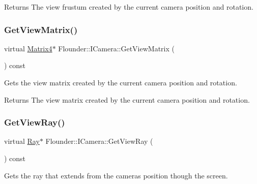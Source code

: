 \begin{DoxyReturn}{Returns}
The view frustum created by the current camera position and rotation. 
\end{DoxyReturn}
\mbox{\label{class_flounder_1_1_i_camera_a959df8b3c98c82dc428dcf26b4650913}} 
\subsubsection{\texorpdfstring{Get\+View\+Matrix()}{GetViewMatrix()}}
{\footnotesize\ttfamily virtual \hyperlink{class_flounder_1_1_matrix4}{Matrix4}$\ast$ Flounder\+::\+I\+Camera\+::\+Get\+View\+Matrix (\begin{DoxyParamCaption}{ }\end{DoxyParamCaption}) const\hspace{0.3cm}{\ttfamily [pure virtual]}}



Gets the view matrix created by the current camera position and rotation. 

\begin{DoxyReturn}{Returns}
The view matrix created by the current camera position and rotation. 
\end{DoxyReturn}
\mbox{\label{class_flounder_1_1_i_camera_a28bd4870a68a234e8f188229387625c7}} 
\subsubsection{\texorpdfstring{Get\+View\+Ray()}{GetViewRay()}}
{\footnotesize\ttfamily virtual \hyperlink{class_flounder_1_1_ray}{Ray}$\ast$ Flounder\+::\+I\+Camera\+::\+Get\+View\+Ray (\begin{DoxyParamCaption}{ }\end{DoxyParamCaption}) const\hspace{0.3cm}{\ttfamily [pure virtual]}}



Gets the ray that extends from the cameras position though the screen. 

